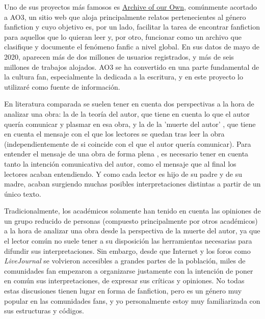 \documentclass{pre-tfg}
\begin{document}
Uno de sus proyectos más famosos es \href{https://www.archiveofourown.org/}{Archive of our Own}, comúnmente acortado a AO3, un sitio web que aloja principalmente relatos pertenecientes al género fanfiction y cuyo objetivo es, por un lado, facilitar la tarea de encontrar fanfiction para aquellos que lo quieran leer y, por otro, funcionar como un archivo que clasifique y documente el fenómeno fanfic a nivel global. En sus datos de mayo de 2020, aparecen más de dos millones de usuarios registrados, y más de seis millones de trabajos alojados. AO3 se ha convertido en una parte fundamental de la cultura fan, especialmente la dedicada a la escritura, y en este proyecto lo utilizaré como fuente de información.


En literatura comparada se suelen tener en cuenta dos perspectivas a la hora de analizar una obra: la de la teoría del autor, que tiene en cuenta lo que el autor quería comunicar y plasmar en esa obra, y la de la 'muerte del autor' \cite{Barthes}, que tiene en cuenta el mensaje con el que los lectores se quedan tras leer la obra (independientemente de si coincide con el que el autor quería comunicar).
Para entender el mensaje de una obra de forma plena \cite{ellis_2018}, es necesario tener en cuenta tanto la intención comunicativa del autor, como el mensaje que al final los lectores acaban entendiendo. Y como cada lector es hijo de su padre y de su madre, acaban surgiendo muchas posibles interpretaciones distintas a partir de un único texto.

Tradicionalmente, los académicos solamente han tenido en cuenta las opiniones de un grupo reducido de personas (compuesto principalmente por otros académicos) a la hora de analizar una obra desde la perspectiva de la muerte del autor, ya que el lector común no suele tener a su disposición las herramientas necesarias para difundir sus interpretaciones. Sin embargo, desde que Internet y los foros como \textit{LiveJournal} se volvieron accesibles a grandes partes de la población, miles de comunidades fan empezaron a organizarse justamente con la intención de poner en común sus interpretaciones, de expresar sus críticas y opiniones. No todas estas discusiones tienen lugar en forma de fanfiction, pero es un género muy popular en las comunidades fans, y yo personalmente estoy muy familiarizada con sus estructuras y códigos.
\end{document}
